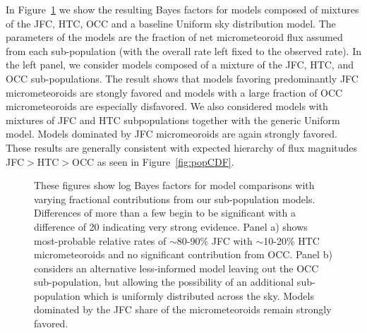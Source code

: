 \documentclass[twocolumn, trackchanges]{aastex62}
\begin{document}
In Figure~\ref{fig:bayes} we show the resulting Bayes factors for models composed of mixtures of the JFC, HTC, OCC and a baseline Uniform sky distribution model.  The parameters of the models are the fraction of net micrometeoroid flux assumed from each sub-population (with the overall rate left fixed to the observed rate). In the left panel, we consider models composed of a mixture of the JFC, HTC, and OCC sub-populations.  The result shows that models favoring predominantly JFC micrometeoroids are stongly favored and models with a large fraction of OCC micrometeoroids are especially disfavored.  We also considered models with mixtures of JFC and HTC subpopulations together with the generic Uniform model.  Models dominated by JFC micromeoroids are again strongly favored.  These results are generally consistent with expected hierarchy of flux magnitudes JFC$>$HTC$>$OCC as seen in Figure~\ref{fig:popCDF}.
%
\begin{figure}[ht!]
\caption{These figures show log Bayes factors for model comparisons with varying fractional contributions from our sub-population models. Differences of more than a few begin to be significant with a difference of 20 indicating very strong evidence.
  Panel a) shows most-probable relative rates of $\sim$80-90\% JFC with $\sim$10-20\% HTC micrometeoroids and no significant contribution from OCC.  Panel b) considers an alternative less-informed model leaving out the OCC sub-population, but allowing the possibility of an additional sub-population which is uniformly distributed across the sky. Models dominated by the JFC share of the micrometeoroids remain strongly favored. \label{fig:bayes}}
\end{figure}

\end{document}
